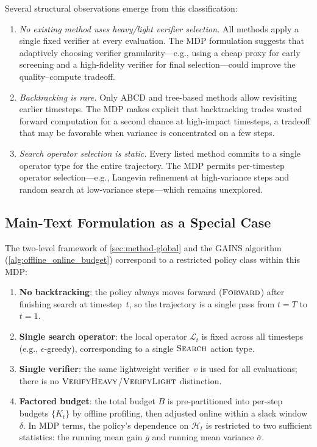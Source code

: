 Several structural observations emerge from this classification:

\begin{enumerate}
  \item \emph{No existing method uses heavy/light verifier selection.}
    All methods apply a single fixed verifier at every evaluation.
    The MDP formulation suggests that adaptively choosing verifier
    granularity---e.g., using a cheap proxy for early screening and a
    high-fidelity verifier for final selection---could improve the
    quality--compute tradeoff.

  \item \emph{Backtracking is rare.}
    Only ABCD and tree-based methods allow revisiting earlier timesteps.
    The MDP makes explicit that backtracking trades wasted forward
    computation for a second chance at high-impact timesteps, a tradeoff
    that may be favorable when variance is concentrated on a few steps.

  \item \emph{Search operator selection is static.}
    Every listed method commits to a single operator type for the entire
    trajectory.
    The MDP permits per-timestep operator selection---e.g., Langevin
    refinement at high-variance steps and random search at low-variance
    steps---which remains unexplored.
\end{enumerate}

\subsection{Main-Text Formulation as a Special Case}

The two-level framework of \cref{sec:method-global} and the GAINS
algorithm (\cref{alg:offline_online_budget}) correspond to a restricted
policy class within this MDP:

\begin{enumerate}
  \item \textbf{No backtracking}: the policy always moves forward
    ($\textsc{Forward}$) after finishing search at timestep~$t$, so the
    trajectory is a single pass from $t = T$ to $t = 1$.
  \item \textbf{Single search operator}: the local operator
    $\mathcal{L}_t$ is fixed across all timesteps (e.g.,
    $\epsilon$-greedy), corresponding to a single
    $\textsc{Search}$ action type.
  \item \textbf{Single verifier}: the same lightweight verifier~$v$ is
    used for all evaluations; there is no
    $\textsc{VerifyHeavy}$/$\textsc{VerifyLight}$ distinction.
  \item \textbf{Factored budget}: the total budget $B$ is pre-partitioned
    into per-step budgets $\{K_t\}$ by offline profiling, then adjusted
    online within a slack window~$\delta$.
    In MDP terms, the policy's dependence on
    $\mathcal{H}_t$ is restricted to two sufficient statistics:
    the running mean gain $\bar{g}$ and running mean variance
    $\bar{\sigma}$.
\end{enumerate}

